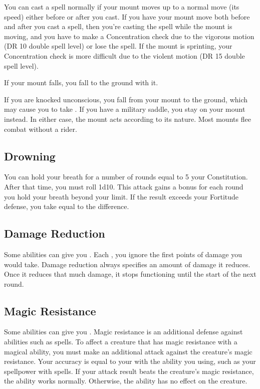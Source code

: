          You can cast a spell normally if your mount moves up to a normal move (its speed) either before or after you cast. If you have your mount move both before and after you cast a spell, then you're casting the spell while the mount is moving, and you have to make a Concentration check due to the vigorous motion (DR 10 \add double spell level) or lose the spell. If the mount is sprinting, your Concentration check is more difficult due to the violent motion (DR 15 \add double spell level).

         If your mount falls, you fall to the ground with it.

         If you are knocked unconscious, you fall from your mount to the ground, which may cause you to take .
        If you have a military saddle, you stay on your mount instead.
        In either case, the mount acts according to its nature.
        Most mounts flee combat without a rider.

    \subsection{Drowning}\label{Drowning}
        You can hold your breath for a number of rounds equal to 5 \add your Constitution.
        After that time, you must roll 1d10.
        This attack gains a  bonus for each round you hold your breath beyond your limit.
        If the result exceeds your Fortitude defense, you take  equal to the difference.

    \subsection{Damage Reduction}\label{Damage Reduction}
        Some abilities can give you .
        Each , you ignore the first points of damage you would take.
        Damage reduction always specifies an amount of damage it reduces.
        Once it reduces that much damage, it stops functioning until the start of the next round.

    \subsection{Magic Resistance}\label{Magic Resistance}
        Some abilities can give you .
        Magic resistance is an additional defense against  abilities such as spells.
        To affect a creature that has magic resistance with a magical ability, you must make an additional attack against the creature's magic resistance.
        Your accuracy is equal to your  with the ability you using, such as your spellpower with spells.
        If your attack result beats the creature's magic resistance, the ability works normally.
        Otherwise, the ability has no effect on the creature.

